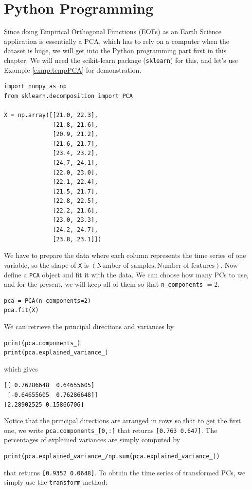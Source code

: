 \section{Python Programming}
Since doing Empirical Orthogonal Functions (EOFs) as an Earth Science application is essentially a PCA, which has to rely on a computer when the dataset is huge, we will get into the Python programming part first in this chapter. We will need the scikit-learn package (\texttt{sklearn}) for this, and let's use Example \ref{exmp:tempPCA} for demonstration.
\begin{lstlisting}
import numpy as np
from sklearn.decomposition import PCA

X = np.array([[21.0, 22.3],
              [21.8, 21.6],
              [20.9, 21.2],
              [21.6, 21.7],
              [23.4, 23.2],
              [24.7, 24.1],
              [22.0, 23.0],
              [22.1, 22.4],
              [21.5, 21.7],
              [22.8, 22.5],
              [22.2, 21.6],
              [23.0, 23.3],
              [24.2, 24.7],
              [23.8, 23.1]])
\end{lstlisting}
We have to prepare the data where each column represents the time series of one variable, so the shape of \verb|X| is $(\text{Number of samples}, \text{Number of features})$. Now define a \verb|PCA| object and fit it with the data. We can choose how many PCs to use, and for the present, we will keep all of them so that \verb|n_components| $=2$.
\begin{lstlisting}
pca = PCA(n_components=2)
pca.fit(X)
\end{lstlisting}
We can retrieve the principal directions and variances by
\begin{lstlisting}
print(pca.components_)
print(pca.explained_variance_)
\end{lstlisting}
which gives
\begin{lstlisting}
[[ 0.76286648  0.64655605]
 [-0.64655605  0.76286648]]
[2.28902525 0.15866706] 
\end{lstlisting}
Notice that the principal directions are arranged in rows so that to get the first one, we write \verb|pca.components_[0,:]| that returns \verb|[0.763 0.647]|. The percentages of explained variances are simply computed by
\begin{lstlisting}
print(pca.explained_variance_/np.sum(pca.explained_variance_))
\end{lstlisting}
that returns \verb|[0.9352 0.0648]|. To obtain the time series of transformed PCs, we simply use the \verb|transform| method:
